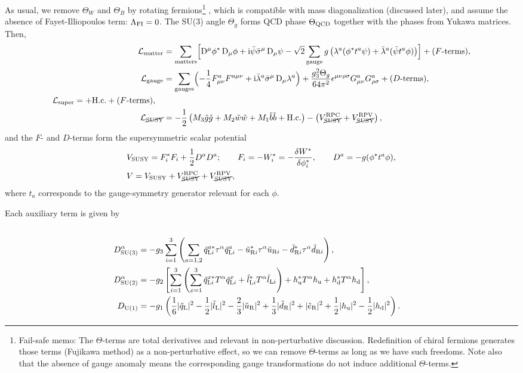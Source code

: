 \documentclass[CheatSheet]{subfiles}
\begin{document}
As usual, we remove $\Theta_W$ and $\Theta_B$ by rotating fermions\footnote{%
Fail-safe memo:
The $\Theta$-terms are total derivatives and relevant in non-perturbative discussion.
Redefinition of chiral fermions generates those terms (Fujikawa method) as a non-perturbative effect, so we can remove $\Theta$-terms as long as we have such freedoms.
Note also that the absence of gauge anomaly means the corresponding gauge transformations do not induce additional $\Theta$-terms.
}
, which is compatible with mass diagonalization (discussed later), and assume the absence of Fayet-Illiopoulos term: $\Lambda_{\mathrm{FI}}=0$.
The SU(3) angle $\Theta_g$ forms QCD phase $\Theta_{\mathrm{QCD}}$ together with the phases from Yukawa matrices.
Then,
\begin{align}
 \mathcal L\w{matter} &= \sum\w{matters}\Bigl[\DD^\mu\phi^*\DD_\mu\phi+\ii\bpsi\bsigma^\mu\DD_\mu\psi
- \sqrt2\sum\w{gauge} g\left(\lambda^a(\phi^*t^a\psi)+\blambda^a(\bpsi t^a\phi)\right)
\Bigr] + \text{($F$-terms)},\\
 \mathcal L\w{gauge} &= \sum\w{gauges}\Bigl(-\frac14F^a_{\mu\nu}F^{a\mu\nu}+\ii\blambda^a\bsigma^\mu\DD_\mu\lambda^a\Bigr) + \frac{g_3^2\Theta_g}{64\pi^2}\epsilon^{\mu\nu\rho\sigma}G^a_{\mu\nu}G^a_{\rho\sigma}+ \text{($D$-terms)},
\\
\begin{split}
  \mathcal L\w{super} &=
   
+ \text{H.c.} +\text{($F$-terms)},
\end{split}\\
\mathcal L_{\text{\cancel{SUSY}}}
&=
- \frac12\left(M_3\tig\tig+M_2\tiw\tiw+M_1\tib\tib+\text{H.c.}\right)
-
\left(
V^{\mathrm{RPC}}_{\text{\cancel{SUSY}}}
+V^{\mathrm{RPV}}_{\text{\cancel{SUSY}}}\right),
\end{align}
and the $F$- and $D$-terms form the supersymmetric scalar potential
\begin{align}
& V_{\mathrm{SUSY}} = F^{*}_i F_i+\frac12 D^aD^a;
\qquad
 F_i = -W_i^* = -\frac{\delta W^*}{\delta \phi_i^*},
\qquad
 D^a = -g(\phi^* t^a \phi),
\\
&V=V_{\mathrm{SUSY}} +
V^{\mathrm{RPC}}_{\text{\cancel{SUSY}}}
+V^{\mathrm{RPV}}_{\text{\cancel{SUSY}}},
\end{align}
where $t_a$ corresponds to the gauge-symmetry generator relevant for each $\phi$.

Each auxiliary term is given by
\begin{align}

\\
D\w{SU(3)}^\alpha &= -g_3\sum_{i=1}^3\left(
 \sum_{a=1,2}
  \tqL[i]^{a*} \tau^\alpha \tqL[i]^{a}
- \tuR[i]^{*} \tau^\alpha \tuR[i]
- \tdR[i]^{*} \tau^\alpha \tdR[i]
\right),\\
%
D\w{SU(2)}^\alpha &= -g_2\left[
   \sum_{i=1}^3\left(
  \sum_{x=1}^3 \tqL[i]^{x*}T^\alpha\tqL[i]^{x}
+              \tlL[i]^{*}T^\alpha \tlL[i]
  \right)
+ \hu^*T^\alpha\hu
+ \hd^*T^\alpha\hd
\right],\\
%
 D\w{U(1)} &= -g_1\left(
  \frac16|\tqL|^2
- \frac12|\tlL|^2
- \frac23|\tuR|^2
+ \frac13|\tdR|^2
+        |\teR|^2
+ \frac12|\hu|^2
- \frac12|\hd|^2
\right).
\end{align}
\end{document}
